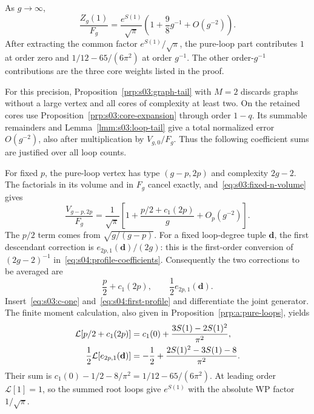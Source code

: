 \begin{prp}\label{prp:s04:first-correction}
As $g\to\infty$,
\begin{equation}\label{eq:s04:first-correction}
 \frac{Z_g(1)}{F_g}
 =\frac{e^{S(1)}}{\sqrt\pi}
       \left(1+\frac{9}{8}g^{-1}+O(g^{-2})\right).
\end{equation}
After extracting the common factor $e^{S(1)}/\sqrt\pi$, the pure-loop
part contributes $1$ at order zero and
$1/12-65/(6\pi^2)$ at order $g^{-1}$. The other order-$g^{-1}$
contributions are the three core weights listed in the proof.
\end{prp}
\begin{prf}
For this precision, Proposition~\ref{prp:s03:graph-tail} with $M=2$
discards graphs without a large vertex and all cores of complexity
at least two. On the retained cores use
Proposition~\ref{prp:s03:core-expansion} through order $1-q$.
Its summable remainders and Lemma~\ref{lmm:s03:loop-tail} give a total
normalized error $O(g^{-2})$, also after multiplication by
$V_{g,0}/F_g$. Thus the following coefficient sums
are justified over all loop counts.

For fixed $p$, the pure-loop vertex has type $(g-p,2p)$ and complexity
$2g-2$. The factorials in its volume and in $F_g$ cancel exactly,
and~\eqref{eq:s03:fixed-n-volume} gives
\begin{equation}\label{eq:s04:pure-loop-volume}
 \frac{V_{g-p,2p}}{F_g}
 =\frac1{\sqrt\pi}
  \left[1+\frac{p/2+c_1(2p)}g+O_p(g^{-2})\right].
\end{equation}
The $p/2$ term comes from $\sqrt{g/(g-p)}$. For a fixed loop-degree
tuple $\mathbf d$, the first descendant correction is
$e_{2p,1}(\mathbf d)/(2g)$: this is the first-order conversion of
$(2g-2)^{-1}$ in~\eqref{eq:s04:profile-coefficients}.
Consequently the two corrections to be averaged are
\[
 \frac p2+c_1(2p),\qquad \frac12e_{2p,1}(\mathbf d).
\]
Insert~\eqref{eq:s03:c-one} and~\eqref{eq:s04:first-profile} and
differentiate the joint generator. The finite moment calculation,
also given in Proposition~\ref{prp:a:pure-loops}, yields
\begin{align}
 \mathcal L[p/2+c_1(2p)]
    &=c_1(0)+\frac{3S(1)-2S(1)^2}{\pi^2},\notag\\
 \frac12\mathcal L[e_{2p,1}(\mathbf d)]
    &=-\frac12+\frac{2S(1)^2-3S(1)-8}{\pi^2}.
 \label{eq:s04:first-loop-averages}
\end{align}
Their sum is
$c_1(0)-1/2-8/\pi^2=1/12-65/(6\pi^2)$.
At leading order $\mathcal L[1]=1$, so the summed root loops give
$e^{S(1)}$ with the absolute WP factor $1/\sqrt\pi$.


\end{prf}
